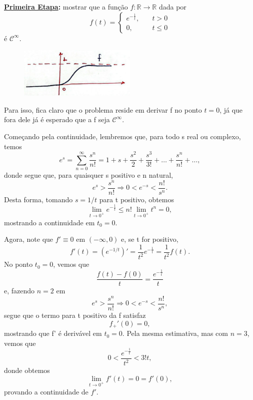 \documentclass[../distribution_theory_notes.tex]{subfiles}
\begin{document}
   \textbf{\underline{Primeira Etapa}:} mostrar que a função \(f:\mathbb{R}\rightarrow \mathbb{R}\) dada por 
     \[
       f(t) = \left\{\begin{array}{ll}
           e^{-\frac{1}{t}}, &\quad t> 0\\ 
           0, &\quad t\leq 0
         \end{array}\right.
     \]
     é \(\mathcal{C}^{\infty}\).
    \begin{figure}[H]
    \begin{center}
    \includegraphics[height=0.5\textheight, width=0.5\textwidth, keepaspectratio]{./Images/plot_f_05.png}
    \end{center}
    \end{figure}

    Para isso, fica claro que o problema reside em derivar f no ponto \(t=0\), já que fora dele já é esperado que a f seja \(\mathcal{C}^{\infty}.\)

    Começando pela continuidade, lembremos que, para todo s real ou complexo, temos 
      \[
        e^{s}=\sum\limits_{n=0}^{\infty}\frac{s^{n}}{n!} = 1+s+\frac{s^{2}}{2}+\frac{s^{3}}{3!}+\dotsc +\frac{s^{n}}{n!}+\dotsc ,
      \]
      donde segue que, para quaisquer s positivo e n natural, 
        \[
          e^{s}>\frac{s^{n}}{n!} \Rightarrow 0<e^{-s}<\frac{n!}{s^{n}}.
        \]
        Desta forma, tomando \(s=1/t\) para t positivo, obtemos 
          \[
            \lim_{t\to 0^{+}}e^{-\frac{1}{t}}\leq n!\lim_{t\to 0^{+}}t^{n}=0,
          \]
          mostrando a continuidade em \(t_{0}=0.\)

          Agora, note que \(f'\equiv 0\) em \((-\infty, 0)\) e, se t for positivo, 
          \[
            f'(t)=(e^{-1/t})' = \frac{1}{t^{2}}e^{-\frac{1}{t}} = \frac{1}{t^{2}}f(t).
          \]
          No ponto \(t_{0}=0\), vemos que 
            \[
              \frac{f(t)-f(0)}{t} = \frac{e^{-\frac{1}{t}}}{t}
            \]
            e, fazendo \(n = 2\) em 
        \[
          e^{s}>\frac{s^{n}}{n!} \Rightarrow 0<e^{-s}<\frac{n!}{s^{n}},
        \]
        segue que o termo para t positivo da f satisfaz
          \[
            f_{+}'(0)= 0,
          \]
          mostrando que f' é derivável em \(t_{0}= 0.\) Pela mesma estimativa, mas com \(n=3\), vemos que 
            \[
              0<\frac{e^{-\frac{1}{t}}}{t^{2}} < 3!t,
            \]
            donde obtemos 
              \[
                \lim_{t\to 0^{+}}f'(t)=0=f'(0),
              \]
              provando a continuidade de \(f'\). 
\end{document}
